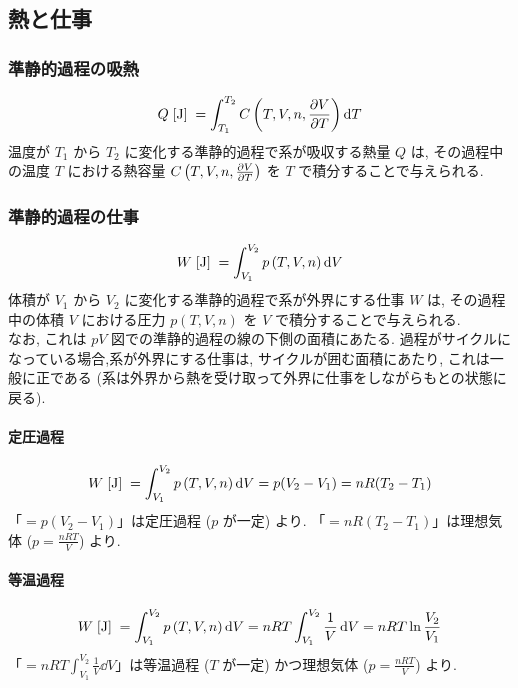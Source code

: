 \documentclass[a4paper,11pt]{jsarticle}
\newcommand{\braunit}[1]{\;\text{[}\unit[per-mode = symbol]{#1}\text{]}\;}
\begin{document}
\subsection{熱と仕事}
\subsubsection{準静的過程の吸熱} \label{section:準静的過程の吸熱}
\begin{align*}
  Q\braunit{\J} = \int_{T_1}^{T_2} C\left(T, V, n, \pdv{V}{T}\right)\dd{T}
\end{align*}
温度が $T_1$ から $T_2$ に変化する準静的過程で系が吸収する熱量 $Q$ は,
その過程中の温度 $T$ における熱容量 $C\left(T, V, n, \pdv{V}{T}\right)$ を $T$ で積分することで与えられる.
\cite[pp.44]{thermo}

\subsubsection{準静的過程の仕事}
\begin{align*}
  W\braunit{\J} = \int_{V_1}^{V_2} p\left(T, V, n\right)\dd{V}
\end{align*}
体積が $V_1$ から $V_2$ に変化する準静的過程で系が外界にする仕事 $W$ は,
その過程中の体積 $V$ における圧力 $p\left(T, V, n\right)$ を $V$ で積分することで与えられる.\\
なお, これは $pV$ 図での準静的過程の線の下側の面積にあたる.
過程がサイクルになっている場合,系が外界にする仕事は, サイクルが囲む面積にあたり, これは一般に正である
(系は外界から熱を受け取って外界に仕事をしながらもとの状態に戻る).
\cite[pp.48]{thermo}
\paragraph{定圧過程}
\begin{align*}
  W\braunit{\J} = \int_{V_1}^{V_2} p\left(T, V, n\right)\dd{V} = p(V_2 - V_1) = nR(T_2 - T_1)
\end{align*}
「$= p(V_2 - V_1)$」は定圧過程 ($p$ が一定) より. 「$= nR(T_2 - T_1)$」は理想気体 ($p = \frac{nRT}{V}$) より.
\cite[pp.48]{thermo}
\paragraph{等温過程} \label{section:等温過程の仕事}
\begin{align*}
  W\braunit{\J} = \int_{V_1}^{V_2} p\left(T, V, n\right)\dd{V} = nRT\int_{V_1}^{V_2}\frac{1}{V}\dd{V} = nRT\ln\frac{V_2}{V_1}
\end{align*}
「$= nRT\int_{V_1}^{V_2}\frac{1}{V}\dd{V}$」は等温過程 ($T$ が一定) かつ理想気体 ($p = \frac{nRT}{V}$) より.
\cite[pp.49]{thermo}
\end{document}
